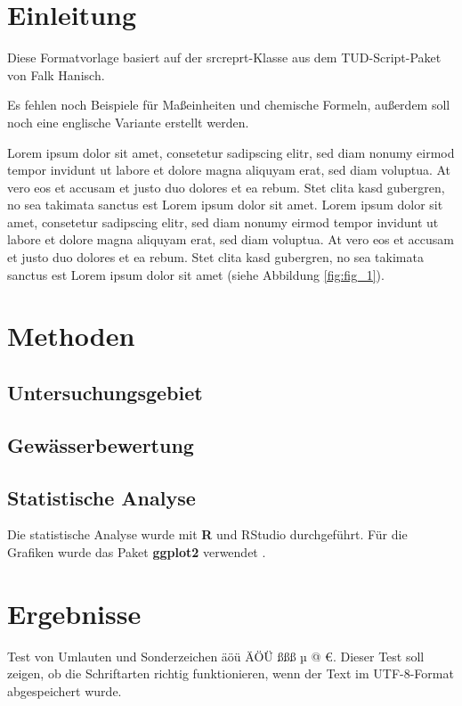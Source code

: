 \documentclass[english,ngerman,BCOR=6mm,cdgeometry=no,DIV=13]{tudscrreprt}
\begin{document}
\chapter{Einleitung}

Diese Formatvorlage basiert auf der srcreprt-Klasse aus dem TUD-Script-Paket von
Falk Hanisch.

Es fehlen noch Beispiele für Maßeinheiten und chemische Formeln, außerdem soll
noch eine englische Variante erstellt werden.


Lorem ipsum dolor sit amet, consetetur sadipscing elitr, sed diam nonumy eirmod
tempor invidunt ut labore et dolore magna aliquyam erat, sed diam voluptua. At
vero eos et accusam et justo duo dolores et ea rebum. Stet clita kasd gubergren,
no sea takimata sanctus est Lorem ipsum dolor sit amet. Lorem ipsum dolor sit
amet, consetetur sadipscing elitr, sed diam nonumy eirmod tempor invidunt ut
labore et dolore magna aliquyam erat, sed diam voluptua. At vero eos et accusam
et justo duo dolores et ea rebum. Stet clita kasd gubergren, no sea takimata
sanctus est Lorem ipsum dolor sit amet (siehe Abbildung \ref{fig:fig_1}).

\chapter{Methoden}

\section{Untersuchungsgebiet}

\section{Gewässerbewertung}

\section{Statistische Analyse}

Die statistische Analyse wurde mit \textbf{R} \parencite{r-core-2024} und RStudio
\parencite{rstudio-2024} durchgeführt. Für die Grafiken
wurde das Paket \textbf{ggplot2} verwendet \parencite{wickham-ggplot2-2016}.


\chapter{Ergebnisse}

Test von Umlauten und Sonderzeichen äöü ÄÖÜ ßßß µ @ €. Dieser Test soll zeigen,
ob die Schriftarten richtig funktionieren, wenn der Text im UTF-8-Format
abgespeichert wurde.
\end{document}
